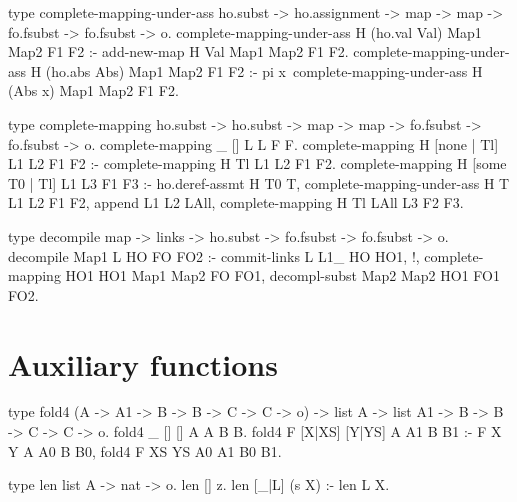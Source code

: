 \begin{elpicode}
  type complete-mapping-under-ass ho.subst -> ho.assignment -> 
    map -> map ->  fo.fsubst -> fo.fsubst -> o.
  complete-mapping-under-ass H (ho.val Val) Map1 Map2 F1 F2 :- 
    add-new-map H Val Map1 Map2 F1 F2.
  complete-mapping-under-ass H (ho.abs Abs) Map1 Map2 F1 F2 :- 
    pi x\ complete-mapping-under-ass H (Abs x) Map1 Map2 F1 F2.

  type complete-mapping ho.subst -> ho.subst ->   
    map -> map -> fo.fsubst -> fo.fsubst -> o.
  complete-mapping _ [] L L F F.
  complete-mapping H [none | Tl] L1 L2 F1 F2 :-   
    complete-mapping H Tl L1 L2 F1 F2.
  complete-mapping H [some T0 | Tl] L1 L3 F1 F3 :-
    ho.deref-assmt H T0 T,
    complete-mapping-under-ass H T L1 L2 F1 F2, 
    append L1 L2 LAll,
    complete-mapping H Tl LAll L3 F2 F3.

  type decompile map -> links -> ho.subst -> 
    fo.fsubst -> fo.fsubst -> o.
  decompile Map1 L HO FO FO2 :- 
    commit-links L L1_ HO HO1, !,
    complete-mapping HO1 HO1 Map1 Map2 FO FO1,
    decompl-subst Map2 Map2 HO1 FO1 FO2.
\end{elpicode}

\section{Auxiliary functions}

\begin{elpicode}
  type fold4 (A -> A1 -> B -> B -> C -> C -> o) -> list A -> 
    list A1 -> B -> B -> C -> C -> o.
  fold4 _ [] [] A A B B.
  fold4 F [X|XS] [Y|YS] A A1 B B1 :- F X Y A A0 B B0, 
    fold4 F XS YS A0 A1 B0 B1.
  
  type len list A -> nat -> o.
  len [] z.
  len [_|L] (s X) :- len L X.
  
  \end{elpicode}
  